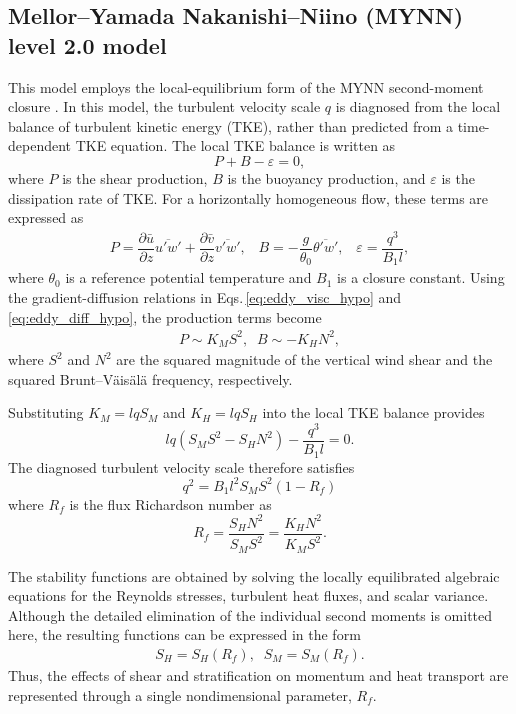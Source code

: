 \subsection{Mellor--Yamada Nakanishi--Niino (MYNN) level 2.0 model}
This model employs the local-equilibrium form of the MYNN second-moment closure \citep{Nakanishi2006}.
In this model, the turbulent velocity scale $q$ is diagnosed from the local balance of turbulent kinetic energy (TKE), 
rather than predicted from a time-dependent TKE equation.
The local TKE balance is written as
\begin{equation}
P + B - \varepsilon = 0,
\end{equation}
where $P$ is the shear production, $B$ is the buoyancy production, and $\varepsilon$ is the dissipation rate of TKE. 
For a horizontally homogeneous flow, these terms are expressed as
\begin{align}
  P =  \dfrac{\partial \bar{u}}{\partial z} \overline{u'w'}
     +  \dfrac{\partial \bar{v}}{\partial z} \overline{v'w'}, \;\;\;
  B =   - \dfrac{g}{\theta_0} \overline{\theta'w'}, \;\;\;
  \varepsilon = \dfrac{q^3}{B_1 l},
\label{eq:mynn_l2_tke_terms}
\end{align}
where $\theta_0$ is a reference potential temperature and $B_1$ is a closure constant.
Using the gradient-diffusion relations in Eqs.\,\eqref{eq:eddy_visc_hypo} and \eqref{eq:eddy_diff_hypo},
the production terms become
%
\begin{align}
 P \sim K_M S^2, \;\; B \sim -K_H N^2, 
\label{eq:mynn_l2_production}
\end{align}
%
where $S^2$ and $N^2$ are the squared magnitude of the vertical wind shear and the squared Brunt--V\"ais\"al\"a frequency, respectively.


Substituting $K_M=lqS_M$ and $K_H=lqS_H$ into the local TKE balance provides
\begin{equation}
lq\left(S_M S^2-S_H N^2\right) - \frac{q^3}{B_1l} = 0.
\end{equation}
The diagnosed turbulent velocity scale therefore satisfies
\begin{equation}
q^2 = B_1 l^2 S_M S^2(1-R_f)
\label{eq:TKE_local_equilibrium}
\end{equation}
where $R_f$ is the flux Richardson number as
%
\begin{equation}
R_f = \frac{S_HN^2}{S_MS^2} = \frac{K_HN^2}{K_MS^2}.
\label{eq:mynn_flux_richardson}
\end{equation}
%

The stability functions are obtained by solving the locally equilibrated algebraic equations for the Reynolds stresses, turbulent heat fluxes, and scalar variance.
Although the detailed elimination of the individual second moments is omitted here, the resulting functions can be expressed in the form
%
\begin{align}
S_H = S_H(R_f), \;\;
S_M = S_M(R_f).
\label{eq:mynn_stability_functions_rf}
\end{align}
%
Thus, the effects of shear and stratification on momentum and heat transport are represented through a single nondimensional parameter, $R_f$.

